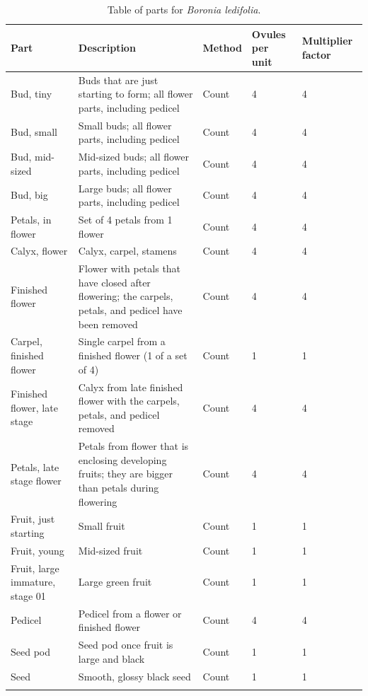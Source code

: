 \documentclass[10pt,twoside]{article}\usepackage[]{graphicx}\usepackage[]{color}
\begin{document}
\clearpage
\begingroup\small
\begin{longtable}{p{4.5cm}p{6cm}p{2cm}p{1cm}p{1cm}}
\caption{Table of parts for \emph{Boronia ledifolia}.} \\ 
  \hline
Part & Description & Method & Ovules per unit & Multiplier factor \\ 
  \hline
Bud, tiny & Buds that are just starting to form; all flower parts, including pedicel & Count & 4 &   4 \\ 
  Bud, small & Small buds; all flower parts, including pedicel & Count & 4 &   4 \\ 
  Bud, mid-sized & Mid-sized buds; all flower parts, including pedicel & Count & 4 &   4 \\ 
  Bud, big & Large buds; all flower parts, including pedicel & Count & 4 &   4 \\ 
  Petals, in flower & Set of 4 petals from 1 flower & Count & 4 &   4 \\ 
  Calyx, flower & Calyx, carpel, stamens & Count & 4 &   4 \\ 
  Finished flower & Flower with petals that have closed after flowering; the carpels, petals, and pedicel have been removed & Count & 4 &   4 \\ 
  Carpel, finished flower & Single carpel from a finished flower (1 of a set of 4) & Count & 1 &   1 \\ 
  Finished flower, late stage & Calyx from late finished flower with the carpels, petals, and pedicel removed & Count & 4 &   4 \\ 
  Petals, late stage flower & Petals from flower that is enclosing developing fruits; they are bigger than petals during flowering & Count & 4 &   4 \\ 
  Fruit, just starting & Small fruit & Count & 1 &   1 \\ 
  Fruit, young & Mid-sized fruit & Count & 1 &   1 \\ 
  Fruit, large immature, stage 01 & Large green fruit & Count & 1 &   1 \\ 
  Pedicel & Pedicel from a flower or finished flower & Count & 4 &   4 \\ 
  Seed pod & Seed pod once fruit is large and black & Count & 1 &   1 \\ 
  Seed & Smooth, glossy black seed & Count & 1 &   1 \\ 
   \hline
\hline
\label{tab:parts_Boronia_ledifolia}
\end{longtable}
\endgroup
\end{document}
